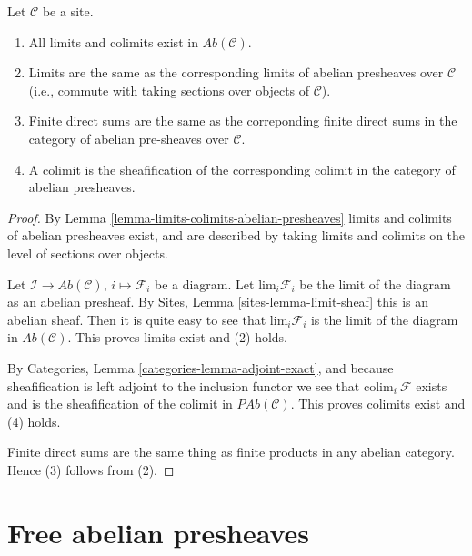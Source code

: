 \begin{lemma}
\label{lemma-limits-colimits-abelian-sheaves}
Let $\mathcal{C}$ be a site.
\begin{enumerate}
\item All limits and colimits exist in $\textit{Ab}(\mathcal{C})$.
\item Limits are the same as the corresponding limits of abelian presheaves
over $\mathcal{C}$ (i.e., commute with taking sections over objects of
$\mathcal{C}$).
\item Finite direct sums are the same as the correponding finite direct sums
in the category of abelian pre-sheaves over $\mathcal{C}$.
\item A colimit is the sheafification of the corresponding colimit in
the category of abelian presheaves.
\end{enumerate}
\end{lemma}

\begin{proof}
By Lemma \ref{lemma-limits-colimits-abelian-presheaves} limits and colimits
of abelian presheaves exist, and are described by taking limits and colimits
on the level of sections over objects.

\medskip\noindent
Let $\mathcal{I} \to \textit{Ab}(\mathcal{C})$, $i \mapsto \mathcal{F}_i$
be a diagram. Let $\text{lim}_i \mathcal{F}_i$ be the limit of the diagram
as an abelian presheaf. By Sites, Lemma \ref{sites-lemma-limit-sheaf}
this is an abelian sheaf. Then it is quite easy to see that
$\text{lim}_i \mathcal{F}_i$ is the limit of the diagram in
$\textit{Ab}(\mathcal{C})$. This proves limits exist and (2) holds.

\medskip\noindent
By Categories, Lemma \ref{categories-lemma-adjoint-exact}, and because
sheafification is left adjoint to the inclusion functor we see that
$\text{colim}_i\ \mathcal{F}$ exists and is the sheafification of the colimit
in $\textit{PAb}(\mathcal{C})$. This proves colimits exist and (4) holds.

\medskip\noindent
Finite direct sums are the same thing as finite products in any abelian
category. Hence (3) follows from (2).
\end{proof}







\section{Free abelian presheaves}
\label{section-free-abelian-presheaf}

